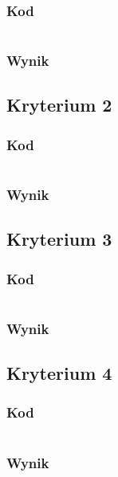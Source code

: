 \documentclass{article}
\begin{document}
\subsubsection{Kod}
\begin{lstlisting}
\end{lstlisting}

\subsubsection{Wynik}

\subsection{Kryterium 2}
\subsubsection{Kod}
\begin{lstlisting}
\end{lstlisting}

\subsubsection{Wynik}

\subsection{Kryterium 3}
\subsubsection{Kod}
\begin{lstlisting}
\end{lstlisting}

\subsubsection{Wynik}

\subsection{Kryterium 4}
\subsubsection{Kod}
\begin{lstlisting}
\end{lstlisting}

\subsubsection{Wynik}
\end{document}

